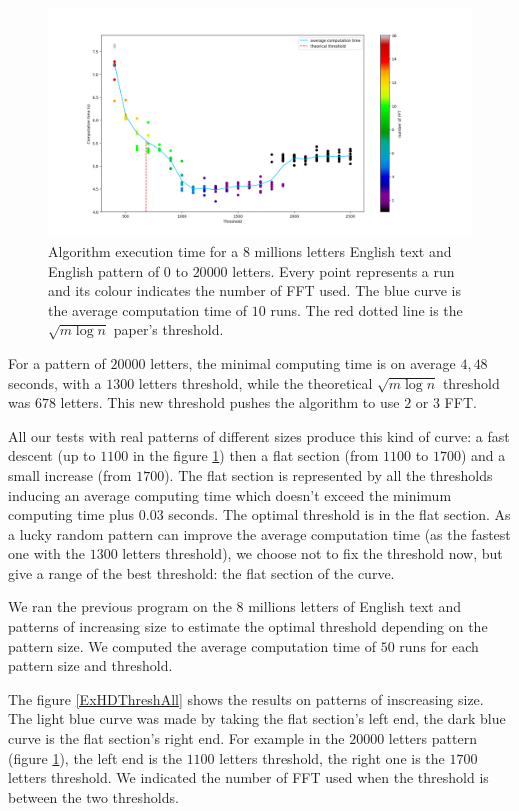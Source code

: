 \documentclass[preprint,12pt]{elsarticle}
\begin{document}
\begin{figure}[h]
\includegraphics[scale=0.45]{./figures/ExHDThreshold.png}
\caption{Algorithm execution time for a $8$ millions letters English text
and English pattern of $0$ to $20 000$ letters.
Every point represents a run and its colour indicates the number of FFT used.
The blue curve is the average computation time of $10$ runs.
The red dotted line is the $\sqrt{m \log n}$ paper's threshold.}
\label{ExHDThresh}
\end{figure}


For a pattern of $20 000$ letters, the minimal computing time is on average $4,48$ seconds,
with a $1300$ letters threshold,
while the theoretical $\sqrt{m \log n}$ threshold was $678$ letters.
This new threshold pushes the algorithm to use $2$ or $3$ FFT.

All our tests with real patterns of different sizes produce this kind of curve:
a fast descent (up to $1100$ in the figure \ref{ExHDThresh})
then a flat section (from $1100$ to $1700$) and a small increase (from $1700$).
The flat section is represented by all the thresholds inducing an average computing time
which doesn't exceed the minimum computing time plus $0.03$ seconds.
The optimal threshold is in the flat section.
As a lucky random pattern can improve the average computation time
(as the fastest one with the $1300$ letters threshold),
we choose not to fix the threshold now, but give a range of the best threshold:
the flat section of the curve.

We ran the previous program on the $8$ millions letters of English text and patterns of increasing size
to estimate the optimal threshold depending on the pattern size.
We computed the average computation time of $50$ runs for each pattern size and threshold.

The figure \ref{ExHDThreshAll} shows the results on patterns of inscreasing size.
The light blue curve was made by taking the flat section's left end, 
the dark blue curve is the flat section's right end.
For example in the $20 000$ letters pattern (figure \ref{ExHDThresh}),
the left end is the $1100$ letters threshold,
the right one is the $1700$ letters threshold.
We indicated the number of FFT used when the threshold is between the two thresholds.
\end{document}
